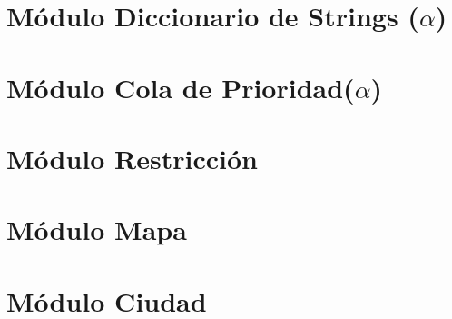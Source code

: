 \documentclass[a4paper,titlepage]{article}
\begin{document}


\section{Módulo Diccionario de Strings ($\alpha$)}



\section{Módulo Cola de Prioridad($\alpha$)}



\section{Módulo Restricción}



\section{Módulo Mapa}



\section{Módulo Ciudad}


\end{document}
